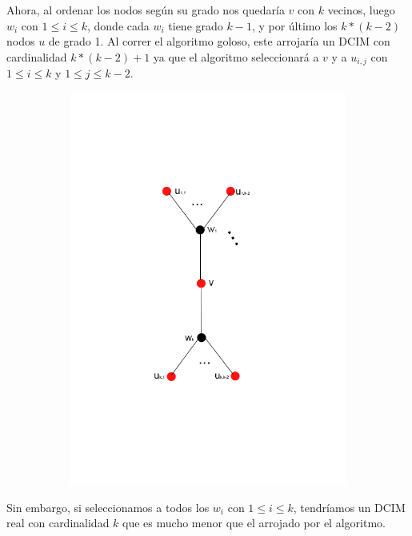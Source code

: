  Ahora, al ordenar los nodos según su grado nos quedaría $v$ con $k$ vecinos, luego $w_i$ con $1 \leq i \leq k$, donde cada $w_i$ tiene grado $k-1$, y por último los $k * (k-2)$ nodos $u$ de grado 1. Al correr el algoritmo goloso, este arrojaría un DCIM con cardinalidad $k * (k-2) + 1$ ya que el algoritmo seleccionará a $v$ y a $u_{i,j}$ con $1 \leq i \leq k$ y $1 \leq j \leq k-2$. \\

\begin{figure}[H]
\centering
\begin{subfigure}[b]{0.5\textwidth}
                \includegraphics[width=\textwidth]{imagenes/grafos-ej3-tp3-2.png}
                \caption{}
        \end{subfigure}%
\end{figure}


 Sin embargo, si seleccionamos a todos los  $w_i$ con $1 \leq i \leq k$, tendríamos un DCIM real con cardinalidad $k$ que es mucho menor que el arrojado por el algoritmo.

